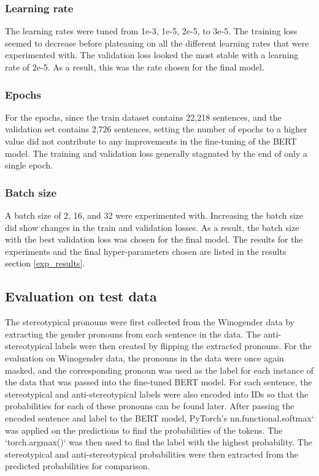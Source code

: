 \documentclass[10pt]{article}
\begin{document}
\subsubsection{Learning rate}
The learning rates were tuned from 1e-3, 1e-5, 2e-5, to 3e-5. The training loss seemed to decrease before plateauing on all the different learning rates that were experimented with. The validation loss looked the most stable with a learning rate of 2e-5. As a result, this was the rate chosen for the final model.

\subsubsection{Epochs}
For the epochs, since the train dataset contains 22,218 sentences, and the validation set contains 2,726 sentences, setting the number of epochs to a higher value did not contribute to any improvements in the fine-tuning of the BERT model. The training and validation loss generally stagnated by the end of only a single epoch.

\subsubsection{Batch size}
A batch size of 2, 16, and 32 were experimented with. Increasing the batch size did show changes in the train and validation losses. As a result, the batch size with the best validation loss was chosen for the final model. The results for the experiments and the final hyper-parameters chosen are listed in the results section \ref{exp_results}.

\subsection{Evaluation on test data}
The stereotypical pronouns were first collected from the Winogender data by extracting the gender pronouns from each sentence in the data. The anti-stereotypical labels were then created by flipping the extracted pronouns.
For the evaluation on Winogender data, the pronouns in the data were once again masked, and the
corresponding pronoun was used as the label for each instance of the data that was passed into the fine-tuned BERT model. For each sentence, the stereotypical and anti-stereotypical labels were also encoded into IDs so that the probabilities for each of these pronouns can be found later. After passing the encoded sentence and label to the BERT model, PyTorch's nn.functional.softmax` was applied on the predictions to find the probabilities of the tokens. The `torch.argmax()` was then used to find the label with the highest probability. The stereotypical and anti-stereotypical probabilities were then extracted from the predicted probabilities for comparison.  
\end{document}

